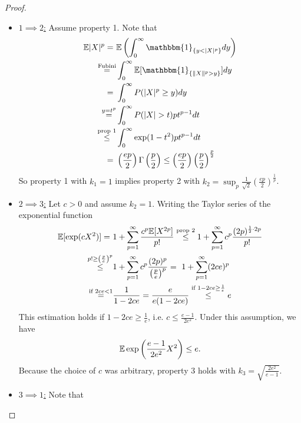 \begin{lemma}
\begin{proof}
\begin{itemize}
\item \underline{$1\implies 2$:} Assume property 1. Note that 
\begin{equation*}
\begin{split}
\E|X|^p = \ & \E \left(
\int_0^\infty \mathbbm{1}_{\{y<|X|^p\}}dy
\right) \\
\overset{\text{Fubini}}= &
\int_0^\infty \E [\mathbbm{1}_{\{\|X\|^p >y\}}]dy \\
=\ & \int_0^\infty P(|X|^p \geq y)dy \\
\overset{y=t^p}= & \int_0^\infty P(|X|>t)pt^{p-1}dt \\
\overset{\text{prop 1}}\leq &
\int_0^\infty \exp(1-t^2) p t^{p-1}dt \\
= \ & \left(
\frac{ep}{2}
\right) \Gamma\left(\frac{p}{2}\right) \leq \left(
\frac{ep}{2}
\right) \left(
\frac{p}{2}
\right)^{\frac{p}{2}}
\end{split}
\end{equation*}
So property 1 with $k_1=1$  implies property 2 with $k_2 = \sup_p \frac{1}{\sqrt{2}} \left(\frac{ep}{2}
\right)^{\frac{1}{p}} $.
\item \underline{$2\implies 3$:} Let $c>0$ and assume $k_2=1$. Writing the Taylor series of the exponential function
\begin{equation*}\label{eq:sub-exp-moment-est}
\begin{split}
\mathbb{E}[\exp(cX^2)] =\  & 1+\sum_{p=1}^\infty \frac{c^p\mathbb{E}[X^{2p}]}{p!} 
\overset{\text{prop 2}}\leq  1 + \sum_{p=1}^\infty c^p \frac{(2p)^{\frac{1}{2}\cdot 2p}}{p!} \\
\overset{p!\geq \left( \frac{p}{e} \right)^p}\leq & 
1+ \sum_{p=1}^\infty c^p \frac{(2p)^p}{\left(\frac{p}{e}\right)^p} 
= \  1 + \sum_{p=1}^\infty (2ce)^p	\\
\overset{\text{if }2ce<1}= & \frac{1}{1-2ce}  = \frac{e}{e(1-2ce)} \overset{\text{if } 1-2ce \geq \frac{1}{e}} \leq e 
\end{split}
\end{equation*}
This estimation holds if $1-2ce \geq \frac{1}{e}$, i.e. $c\leq \frac{e-1}{2e^2}$. Under this assumption, we have
\begin{equation*}
\mathbb{E}\exp\left(
\frac{e-1}{2e^2}X^2
\right) \leq e.
\end{equation*}
Because the choice of $c$ was arbitrary, property 3 holds with $k_3 = \sqrt{\frac{2e^2}{e-1}}$.
\item \underline{$3\implies 1$:}  Note that

\end{itemize}
\end{proof}
\end{lemma}
